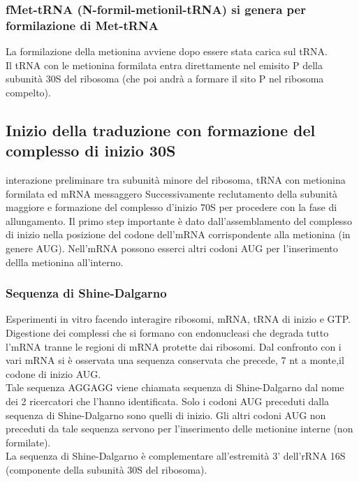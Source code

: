 \documentclass{article}
\begin{document}
\subsubsection{fMet-tRNA (N-formil-metionil-tRNA) si genera per formilazione di Met-tRNA}
La formilazione della metionina avviene dopo essere stata carica sul tRNA.\\
Il tRNA con le metionina formilata entra direttamente nel emisito P della subunità 30S del ribosoma (che poi andrà a formare il sito P nel ribosoma compelto).
\subsection{Inizio della traduzione con formazione del complesso di inizio 30S}
interazione preliminare tra subunità minore del ribosoma, tRNA con metionina
formilata ed mRNA messaggero
Successivamente reclutamento della subunità maggiore e formazione del complesso d'inizio 70S per procedere con
la fase di allungamento.
Il primo step importante è dato dall'assemblamento del complesso di inizio nella
posizione del codone dell'mRNA corrispondente alla metionina (in genere AUG).
Nell'mRNA possono esserci altri codoni AUG per l'inserimento dellla metionina
all'interno.
\subsubsection{Sequenza di Shine-Dalgarno}
Esperimenti in vitro facendo interagire ribosomi, mRNA, tRNA di inizio e GTP.
Digestione dei complessi che si formano con endonucleasi che degrada tutto l'mRNA tranne le regioni di mRNA protette dai ribosomi. Dal confronto con i vari mRNA si è osservata una sequenza conservata che precede,
7 nt a monte,il codone di inizio AUG.\\
Tale sequenza AGGAGG viene chiamata
sequenza di Shine-Dalgarno dal nome dei 2 ricercatori che l'hanno identificata. Solo i codoni AUG preceduti dalla sequenza di Shine-Dalgarno sono quelli di inizio.
Gli altri codoni AUG non preceduti da tale sequenza servono per l'inserimento delle metionine interne (non formilate).\\
La sequenza di Shine-Dalgarno è complementare all'estremità 3' dell'rRNA 16S (componente della subunità 30S del ribosoma).
\end{document}
